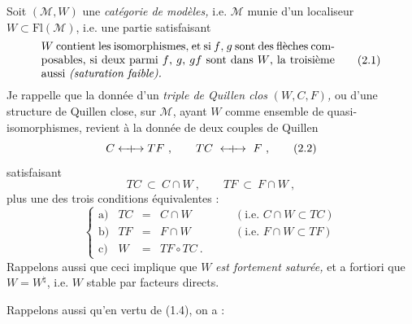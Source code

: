 \documentclass[11pt]{article}
\newcommand{\Qcouple}{\mathrel{\leftarrow\mkern-9mu{+}\mkern-9mu\rightarrow}}
\begin{document}
Soit $(\mathcal{M}, W)$ une \textit{catégorie de modèles,} i.e. $\mathcal{M}$ munie d'un localiseur $W \subset \mathrm{Fl}(\mathcal{M})$, i.e. une partie satisfaisant
\[
\parbox{0.75\textwidth}{$W$ contient les isomorphismes, et si $f$, $g$ sont des flèches composables, si deux parmi $f$, $g$, $gf$ sont dans $W$, la troisième aussi \textit{(saturation faible).}}
\tag*{(2.1)}
\]
Je rappelle que la donnée d'un \textit{triple de Quillen clos} $(W, C, F)$\textit{,} ou d'une structure de Quillen close, sur $\mathcal{M}$, ayant $W$ comme ensemble de quasi-isomorphismes, revient à la donnée de deux couples de Quillen
\[
C \Qcouple TF\ , \qquad TC \ \Qcouple\ F\ , \tag*{(2.2)}
\]
satisfaisant
\[
TC \ \subset\ C \cap W\ , \qquad TF \ \subset\ F \cap W\ , \tag*{(2.3)}
\]
plus une des trois conditions équivalentes :
\[
\left\{
\begin{array}{lrcll}
\text{a)} & TC & = & C \cap W & \qquad (\text{i.e. } C \cap W \subset TC) \\[1ex]
\text{b)} & TF & = & F \cap W & \qquad (\text{i.e. } F \cap W \subset TF) \\[1ex]
\text{c)} & W & = & TF \circ TC\ . &
\end{array}
\right.
\tag*{(2.4)}
\]
Rappelons aussi que ceci implique que $W$ \textit{est fortement saturée,} et a fortiori que $W = W^{\natural}$, i.e. $W$ stable par facteurs directs.

Rappelons aussi qu'en vertu de (1.4), on a :
\end{document}
